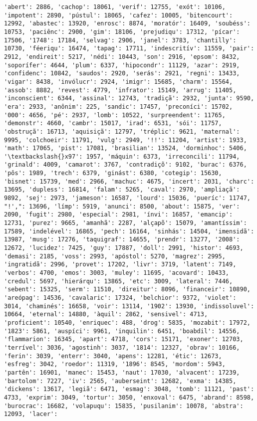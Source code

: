 \begin{Verbatim}[commandchars=\\\{\}]
'abert': 2886, 'cachop': 18061, 'verif': 12755, 'exót': 10106, 'impotent': 2890, 'pústul': 18065, 'cafez': 10005, 'bitencourt': 12992, 'abastec': 13920, 'enrosc': 8874, 'moratór': 16409, 'soubéss': 10753, 'paciênc': 2900, 'gim': 18106, 'prejudiqu': 17312, 'pícar': 17506, '1748': 17184, 'selvag': 2906, 'janel': 3783, 'chantilly': 10730, 'féeriqu': 16474, 'tapag': 17711, 'indescritív': 11559, 'pair': 2912, 'endireit': 5217, 'nédi': 10443, 'son': 2916, 'epsom': 8432, 'soporífer': 4644, 'plum': 6337, 'hipocondr': 11129, 'azar': 2919, 'confidenc': 10842, 'saudos': 2920, 'serás': 2921, 'regni': 13433, 'vigar': 8438, 'invólucr': 2924, 'imigr': 15685, 'charm': 15564, 'assob': 8882, 'revest': 4779, 'infrator': 15149, 'arrug': 11405, 'inconscient': 6344, 'assinal': 12743, 'tradiçã': 2932, 'junta': 9590, 'era': 2933, 'anônim': 225, 'sandic': 17457, 'preconíci': 15702, '000': 4656, 'pé': 2937, 'lomb': 10522, 'surpreendent': 11765, 'demonstr': 4660, 'cambr': 15017, 'irad': 6531, 'sói': 11757, 'obstruçã': 16713, 'aquisiçã': 12797, 'tréplic': 9621, 'maternal': 9995, 'colchoeir': 11791, 'vulg': 2949, '!!': 11204, 'artist': 1933, 'math': 17065, 'pist': 17081, 'brasilian': 13524, 'dorminhoc': 5406, '\textbackslash{}x97': 1957, 'máquin': 6373, 'irreconcili': 11794, 'grinald': 4009, 'camarot': 3767, 'contradiçõ': 9102, 'burac': 6376, 'pôs': 1989, 'trech': 6379, 'ginást': 6380, 'cotegip': 15630, 'bisnet': 15739, 'med': 2966, 'machuc': 4675, 'incert': 2031, 'charc': 13695, 'dupless': 16814, 'falam': 5265, 'caval': 2970, 'ampliaçã': 9892, 'sej': 2973, 'jameson': 16587, 'lourd': 15036, 'pueríc': 11747, "!',": 13696, 'límp': 5919, 'anunci': 8500, 'about': 15875, 'ver': 2090, 'fugit': 2980, 'especial': 2981, 'ínvi': 16857, 'emancip': 12731, 'purez': 9665, 'amanhã': 2287, 'alçapõ': 15079, 'amantíssim': 17589, 'indelével': 16865, 'pech': 16164, 'sinhás': 14504, 'imensidã': 13987, 'musg': 17276, 'taquigraf': 14655, 'prendr': 13277, '2008': 12672, 'lucidez': 7425, 'guy': 17887, 'doll': 2991, 'histor': 4693, 'demasi': 2185, 'voss': 2993, 'apóstol': 5270, 'magrez': 2995, 'ingratidã': 2996, 'provet': 17202, 'livr': 3719, 'latent': 7149, 'verbos': 4700, 'emos': 3003, 'muley': 11695, 'acovard': 10433, 'credul': 5697, 'hierárqu': 13865, 'etc': 3009, 'lateral': 7446, 'sebent': 15325, 'serm': 11510, 'direitur': 8096, 'financeir': 10890, 'areópag': 14536, 'cavalaric': 17324, 'belchior': 9372, 'violet': 3014, 'chaminés': 16658, 'voir': 13114, '1902': 13930, 'indissoluvel': 10664, 'eternal': 14880, 'àquil': 2862, 'sensivel': 4713, 'proficient': 10540, 'enriquec': 488, 'drog': 5835, 'mozabit': 17972, '1823': 5861, 'auspíci': 9961, 'inquilin': 6451, 'boabdil': 14556, 'flammarion': 16345, 'apart': 4718, 'cors': 15171, 'exoner': 12703, 'terrível': 3036, 'agostinh': 3037, '1814': 12327, 'obrav': 10166, 'ferin': 3039, 'enterr': 3040, 'apens': 12281, 'étic': 12673, 'esfreg': 3042, 'roedor': 11319, '1896': 8545, 'mordom': 5943, 'partên': 16901, 'manec': 15453, 'naut': 17030, 'alvacent': 17239, 'bartolom': 7227, 'iv': 2565, 'auberseint': 12682, 'exma': 14385, 'dickens': 13617, 'legiã': 6471, 'esmag': 3048, 'tomb': 11121, 'past': 4733, 'exprim': 3049, 'tortur': 3050, 'enxoval': 6475, 'abrand': 8598, 'burocrac': 16682, 'volapuqu': 15835, 'pusilanim': 10078, 'abstra': 12093, 'lacer': 
\end{Verbatim}
